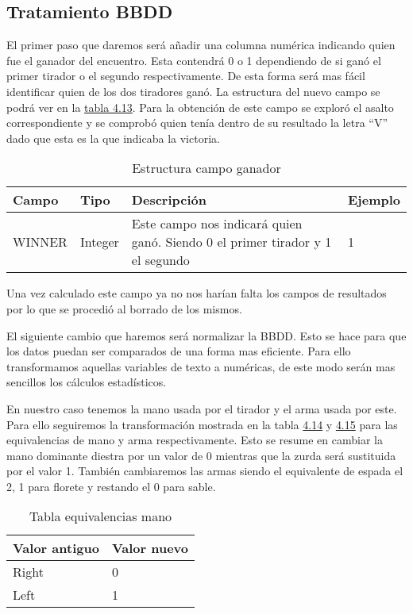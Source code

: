 \subsection{Tratamiento \acs{BBDD}}

El primer paso que daremos será añadir una columna numérica indicando quien
fue el ganador del encuentro. Esta contendrá 0 o 1 dependiendo de si ganó
el primer tirador o el segundo respectivamente. De esta forma será mas fácil
identificar quien de los dos tiradores ganó. La estructura del nuevo campo
se podrá ver en la \hyperref[tab:Estructura campo ganador]{tabla 4.13}. Para la obtención de este campo se exploró
el asalto correspondiente y se comprobó quien tenía dentro de su resultado
la letra \enquote{V} dado que esta es la que indicaba la victoria.

\begin{longtable}{|p{3cm}p{2cm}p{6cm}p{3cm}|}
  \caption{Estructura campo ganador}
  \label{tab:Estructura campo ganador}
  \endfirsthead
  \endhead

  \hline
  \rowcolor[HTML]{C0C0C0}
  Campo & Tipo & Descripción & Ejemplo \\ \hline
  WINNER & Integer & Este campo nos indicará quien ganó. Siendo 0 el primer tirador y 1 el segundo & 1 \\ \hline
\end{longtable}

Una vez calculado este campo ya no nos harían falta los campos de resultados
por lo que se procedió al borrado de los mismos.

El siguiente cambio que haremos será normalizar la \acs{BBDD}. Esto se hace para
que los datos puedan ser comparados de una forma mas eficiente. Para ello
transformamos aquellas variables de texto a numéricas, de este modo serán
mas sencillos los cálculos estadísticos.

En nuestro caso tenemos la mano usada por el tirador y el arma usada por este.
Para ello seguiremos la transformación mostrada en la tabla \hyperref[tab:Tabla equivalencias mano]{4.14} y \hyperref[tab:Tabla equivalencias arma]{4.15} para
las equivalencias de mano y arma respectivamente. Esto se resume en
cambiar la mano dominante diestra por un valor de 0 mientras que la zurda será
sustituida por el valor 1. También cambiaremos las armas siendo el equivalente
de espada el 2, 1 para florete y restando el 0 para sable.

\begin{table}[]
  \centering
  \caption{Tabla equivalencias mano}
  \label{tab:Tabla equivalencias mano}
  \begin{tabular}{|ll|}
    \hline
    \rowcolor[HTML]{C0C0C0}
    Valor antiguo & Valor nuevo \\ \hline
    Right & 0 \\ \hline
    Left & 1 \\ \hline
  \end{tabular}
\end{table}

